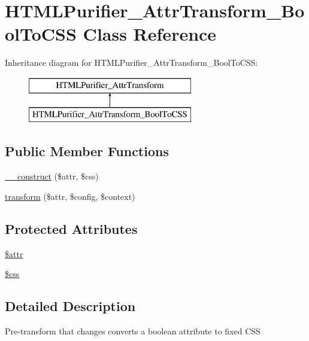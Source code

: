 \hypertarget{classHTMLPurifier__AttrTransform__BoolToCSS}{\section{H\+T\+M\+L\+Purifier\+\_\+\+Attr\+Transform\+\_\+\+Bool\+To\+C\+S\+S Class Reference}
\label{classHTMLPurifier__AttrTransform__BoolToCSS}
}
Inheritance diagram for H\+T\+M\+L\+Purifier\+\_\+\+Attr\+Transform\+\_\+\+Bool\+To\+C\+S\+S\+:\begin{figure}[H]
\begin{center}
\leavevmode
\includegraphics[height=2.000000cm]{classHTMLPurifier__AttrTransform__BoolToCSS}
\end{center}
\end{figure}
\subsection*{Public Member Functions}
\begin{DoxyCompactItemize}
\item 
\hyperlink{classHTMLPurifier__AttrTransform__BoolToCSS_ac7e81ca81720508dcf5b3f54855d81a3}{\+\_\+\+\_\+construct} (\$attr, \$css)
\item 
\hyperlink{classHTMLPurifier__AttrTransform__BoolToCSS_a9ce7a38e9dd0f0607b7997b165eb26d6}{transform} (\$attr, \$config, \$context)
\end{DoxyCompactItemize}
\subsection*{Protected Attributes}
\begin{DoxyCompactItemize}
\item 
\hyperlink{classHTMLPurifier__AttrTransform__BoolToCSS_a74e68fd4d081e0d00bd707b936c0c9af}{\$attr}
\item 
\hyperlink{classHTMLPurifier__AttrTransform__BoolToCSS_a782d1f9d1502c7060a84cca2bd9d3f0d}{\$css}
\end{DoxyCompactItemize}


\subsection{Detailed Description}
Pre-\/transform that changes converts a boolean attribute to fixed C\+S\+S 

